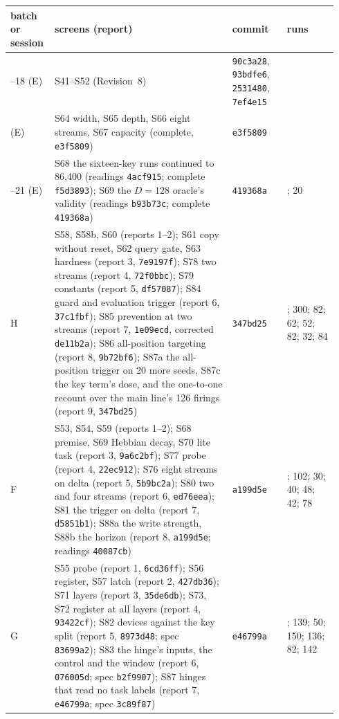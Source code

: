 \documentclass[11pt]{article}
\begin{document}
\begin{table}[H]
\centering
\footnotesize
\setlength{\tabcolsep}{3pt}
\begin{tabular}{@{}>{\raggedright\arraybackslash}p{0.11\linewidth}>{\raggedright\arraybackslash}p{0.52\linewidth}>{\raggedright\arraybackslash}p{0.16\linewidth}>{\raggedright\arraybackslash}p{0.15\linewidth}@{}}
\toprule
batch or session & screens (report) & commit & runs\\
\midrule
15--18 (E) & S41--S52 (Revision~8) & \texttt{90c3a28}, \texttt{93bdfe6}, \texttt{2531480}, \texttt{7ef4e15} & 379\\
19 (E) & S64 width, S65 depth, S66 eight streams, S67 capacity (complete, \texttt{e3f5809}) & \texttt{e3f5809} & 186\\
20--21 (E) & S68 the sixteen-key runs continued to 86{,}400 (readings \texttt{4acf915}; complete \texttt{f5d3893}); S69 the $D = 128$ oracle's validity (readings \texttt{b93b73c}; complete \texttt{419368a}) & \texttt{419368a} & 19; 20\\
H & S58, S58b, S60 (reports 1--2); S61 copy without reset, S62 query gate, S63 hardness (report 3, \texttt{7e9197f}); S78 two streams (report 4, \texttt{72f0bbc}); S79 constants (report 5, \texttt{df57087}); S84 guard and evaluation trigger (report 6, \texttt{37c1fbf}); S85 prevention at two streams (report 7, \texttt{1e09ecd}, corrected \texttt{de11b2a}); S86 all-position targeting (report 8, \texttt{9b72bf6}); S87a the all-position trigger on 20 more seeds, S87c the key term's dose, and the one-to-one recount over the main line's 126 firings (report 9, \texttt{347bd25}) & \texttt{347bd25} & 318; 300; 82; 62; 52; 82; 32; 84\\
F & S53, S54, S59 (reports 1--2); S68 premise, S69 Hebbian decay, S70 lite task (report 3, \texttt{9a6c2bf}); S77 probe (report 4, \texttt{22ec912}); S76 eight streams on delta (report 5, \texttt{5b9bc2a}); S80 two and four streams (report 6, \texttt{ed76eea}); S81 the trigger on delta (report 7, \texttt{d5851b1}); S88a the write strength, S88b the horizon (report 8, \texttt{a199d5e}; readings \texttt{40087cb}) & \texttt{a199d5e} & 322; 102; 30; 40; 48; 42; 78\\
G & S55 probe (report 1, \texttt{6cd36ff}); S56 register, S57 latch (report 2, \texttt{427db36}); S71 layers (report 3, \texttt{35de6db}); S73, S72 register at all layers (report 4, \texttt{93422cf}); S82 devices against the key split (report 5, \texttt{8973d48}; spec \texttt{83699a2}); S83 the hinge's inputs, the control and the window (report 6, \texttt{076005d}; spec \texttt{b2f9907}); S87 hinges that read no task labels (report 7, \texttt{e46799a}; spec \texttt{3c89f87}) & \texttt{e46799a} & 22; 139; 50; 150; 136; 82; 142\\

\end{tabular}
\end{table}
\end{document}
